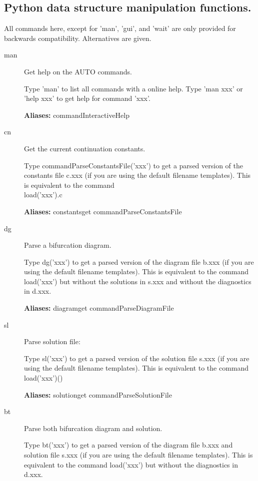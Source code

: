 \documentclass[12pt]{report}
\begin{document}
\subsection{Python data structure manipulation functions.}
\label{sec:clui_ref_python}
All commands here, except for 'man', 'gui', and 'wait' are only
provided for backwards compatibility. Alternatives are given.
\begin{description}
\item[man]
Get help on the AUTO commands.
    
    Type 'man' to list all commands with a online help.
    Type 'man xxx' or 'help xxx' to get help for command 'xxx'.

\textbf{Aliases:} commandInteractiveHelp

\item[cn]
Get the current continuation constants.

    Type commandParseConstantsFile('xxx') to get a parsed version of the constants file
    c.xxx (if you are using the default filename templates).
    This is equivalent to the command\\
    load('xxx').c
    
\textbf{Aliases:} constantsget commandParseConstantsFile

\item[dg]
Parse a bifurcation diagram.

    Type dg('xxx') to get a parsed version of the diagram file b.xxx
    (if you are using the default filename templates).
    This is equivalent to the command load('xxx') but without the
    solutions in s.xxx and without the diagnostics in d.xxx.
    
\textbf{Aliases:} diagramget commandParseDiagramFile

\item[sl]
Parse solution file:

    Type sl('xxx') to get a parsed version of the solution file
    s.xxx (if you are using the default filename templates).
    This is equivalent to the command\\
    load('xxx')()
    
\textbf{Aliases:} solutionget commandParseSolutionFile

\item[bt]
Parse both bifurcation diagram and solution.

    Type bt('xxx') to get a parsed version of the diagram file b.xxx
    and solution file s.xxx (if you are using the default filename
    templates).
    This is equivalent to the command load('xxx') but without the
    diagnostics in d.xxx.
    

\end{description}
\end{document}
